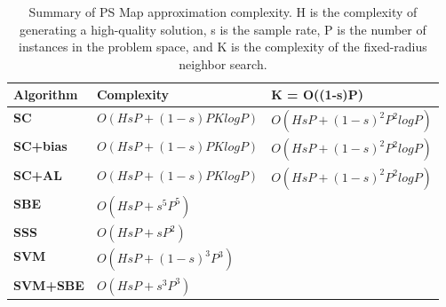 \begin{table}
\begin{center}
  \begin{tabular}{|p{2cm}|p{5cm}|p{5cm}|}
    \hline
    \textbf{Algorithm} & \textbf{Complexity} & \textbf{K = O((1-s)P)}     \\ \hline
    \textbf{SC} &       $O(HsP + (1-s)PKlogP)$   & $O(HsP + (1-s)^2P^2logP)$ \\ \hline
    \textbf{SC+bias} &  $O(HsP + (1-s)PKlogP)$   & $O(HsP + (1-s)^2P^2logP)$ \\ \hline
    \textbf{SC+AL} &    $O(HsP + (1-s)PKlogP)$   & $O(HsP + (1-s)^2P^2logP)$ \\ \hline
    \textbf{SBE} &      $O(HsP + s^5P^5)$         &\\ \hline
    \textbf{SSS} &      $O(HsP + sP^2)$           &\\ \hline
    \textbf{SVM} &      $O(HsP + (1-s)^3P^3)$     &\\ \hline
    \textbf{SVM+SBE} &  $O(HsP + s^3P^3)$         &\\ \hline
  \end{tabular}
  \caption{Summary of PS Map approximation complexity. H is the complexity of generating a high-quality solution, s is the sample rate, P is the number of instances in the problem space, and K is the complexity of the fixed-radius neighbor search.}
  \label{tab:summary-of-complexity}
\end{center}
\end{table}

